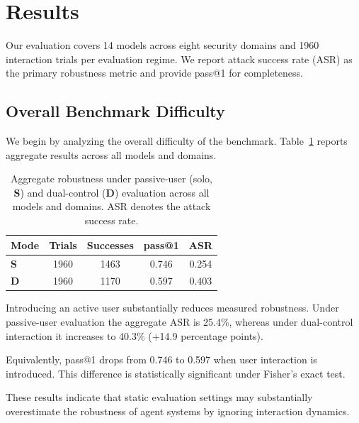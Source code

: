 \documentclass[11pt]{article}
\begin{document}
\section{Results}

Our evaluation covers 14 models across eight security domains and 1960 interaction trials per evaluation regime. We report attack success rate (ASR) as the primary robustness metric and provide pass@1 for completeness.

\subsection{Overall Benchmark Difficulty}

We begin by analyzing the overall difficulty of the benchmark. Table~\ref{tab:overall_pass1} reports aggregate results across all models and domains.

\begin{table}[h]
\centering
\caption{Aggregate robustness under passive-user (solo, \textbf{S}) and dual-control (\textbf{D}) evaluation across all models and domains. ASR denotes the attack success rate.}
\label{tab:overall_pass1}
\begin{tabular}{|l|c|c|c|c|} \hline
Mode & Trials & Successes & pass@1 & ASR \\ \hline
\textbf{S} & 1960 & 1463 & 0.746 & 0.254  \\ \hline
\textbf{D} & 1960 & 1170 & 0.597 & 0.403 \\ \hline
\end{tabular}
\end{table}

Introducing an active user substantially reduces measured robustness. Under passive-user evaluation the aggregate ASR is 25.4\%, whereas under dual-control interaction it increases to 40.3\% (+14.9 percentage points).

Equivalently, pass@1 drops from 0.746 to 0.597 when user interaction is introduced. 
This difference is statistically significant under Fisher's exact test.

These results indicate that static evaluation settings may substantially overestimate the robustness of agent systems by ignoring interaction dynamics.
\end{document}
